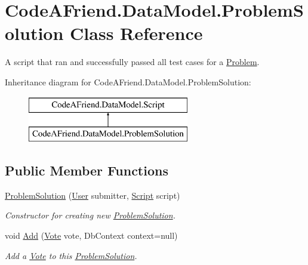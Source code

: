 \hypertarget{class_code_a_friend_1_1_data_model_1_1_problem_solution}{}\section{Code\+A\+Friend.\+Data\+Model.\+Problem\+Solution Class Reference}
\label{class_code_a_friend_1_1_data_model_1_1_problem_solution}


A script that ran and successfully passed all test cases for a \mbox{\hyperlink{class_code_a_friend_1_1_data_model_1_1_problem}{Problem}}. 


Inheritance diagram for Code\+A\+Friend.\+Data\+Model.\+Problem\+Solution\+:\begin{figure}[H]
\begin{center}
\leavevmode
\includegraphics[height=2.000000cm]{class_code_a_friend_1_1_data_model_1_1_problem_solution}
\end{center}
\end{figure}
\subsection*{Public Member Functions}
\begin{DoxyCompactItemize}
\item 
\mbox{\hyperlink{class_code_a_friend_1_1_data_model_1_1_problem_solution_aa0d35cf0023de3ab3b42e433d607bccf}{Problem\+Solution}} (\mbox{\hyperlink{class_code_a_friend_1_1_data_model_1_1_user}{User}} submitter, \mbox{\hyperlink{class_code_a_friend_1_1_data_model_1_1_script}{Script}} script)
\begin{DoxyCompactList}\small\item\em Constructor for creating new \mbox{\hyperlink{class_code_a_friend_1_1_data_model_1_1_problem_solution}{Problem\+Solution}}.\end{DoxyCompactList}\item 
void \mbox{\hyperlink{class_code_a_friend_1_1_data_model_1_1_problem_solution_a2c0f0f4da13003471346d3d2101c4e04}{Add}} (\mbox{\hyperlink{class_code_a_friend_1_1_data_model_1_1_vote}{Vote}} vote, Db\+Context context=null)
\begin{DoxyCompactList}\small\item\em Add a \mbox{\hyperlink{class_code_a_friend_1_1_data_model_1_1_vote}{Vote}} to this \mbox{\hyperlink{class_code_a_friend_1_1_data_model_1_1_problem_solution}{Problem\+Solution}}. \end{DoxyCompactList}\end{DoxyCompactItemize}
